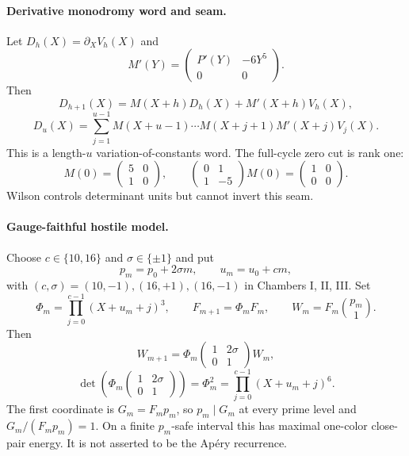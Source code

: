 \documentclass{article}
\begin{document}
\paragraph{Derivative monodromy word and seam.}
Let $D_h(X)=\partial_XV_h(X)$ and
\[
 M'(Y)=\begin{pmatrix}P'(Y)&-6Y^5\\0&0\end{pmatrix}.
\]
Then
\[
 D_{h+1}(X)=M(X+h)D_h(X)+M'(X+h)V_h(X),
\]
\[
 D_u(X)=\sum_{j=1}^{u-1}
 M(X+u-1)\cdots M(X+j+1)M'(X+j)V_j(X).
\]
This is a length-$u$ variation-of-constants word.
The full-cycle zero cut is rank one:
\[
 M(0)=\begin{pmatrix}5&0\\1&0\end{pmatrix},\qquad
 \begin{pmatrix}0&1\\1&-5\end{pmatrix}M(0)
 =\begin{pmatrix}1&0\\0&0\end{pmatrix}.
\]
Wilson controls determinant units but cannot invert this seam.

\paragraph{Gauge-faithful hostile model.}
Choose $c\in\{10,16\}$ and $\sigma\in\{\pm1\}$ and put
\[
 p_m=p_0+2\sigma m,\qquad u_m=u_0+cm,
\]
with $(c,\sigma)=(10,-1),(16,+1),(16,-1)$ in Chambers I, II, III.
Set
\[
 \Phi_m=\prod_{j=0}^{c-1}(X+u_m+j)^3,\qquad
 F_{m+1}=\Phi_mF_m,\qquad
 W_m=F_m\binom{p_m}{1}.
\]
Then
\[
 \boxed{W_{m+1}=\Phi_m
 \begin{pmatrix}1&2\sigma\\0&1\end{pmatrix}W_m,}
\]
\[
 \boxed{\det\!\left(\Phi_m
 \begin{pmatrix}1&2\sigma\\0&1\end{pmatrix}\right)
 =\Phi_m^2=
 \prod_{j=0}^{c-1}(X+u_m+j)^6.}
\]
The first coordinate is $G_m=F_mp_m$, so $p_m\mid G_m$ at every
prime level and $G_m/(F_mp_m)=1$.  On a finite $p_m$-safe interval
this has maximal one-color close-pair energy.  It is not asserted to be
the Ap\'ery recurrence.
\end{document}
